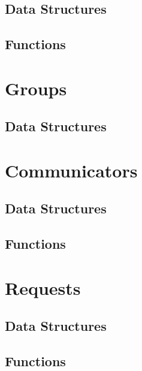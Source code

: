 \documentclass{article}
\begin{document}


\subsection{Data Structures}

\subsection{Functions}


\section{Groups}

\subsection{Data Structures}

%

\section{Communicators}
\subsection{Data Structures}

\subsection{Functions}


%

\section{Requests}
\subsection{Data Structures}

\subsection{Functions}

\end{document}
